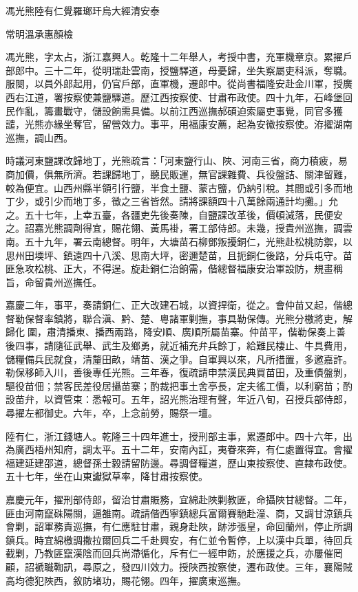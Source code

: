 
\begin{pinyinscope}
馮光熊陸有仁覺羅瑯玕烏大經清安泰

常明溫承惠顏檢

馮光熊，字太占，浙江嘉興人。乾隆十二年舉人，考授中書，充軍機章京。累擢戶部郎中。三十二年，從明瑞赴雲南，授鹽驛道，母憂歸，坐失察屬吏科派，奪職。服闋，以員外郎起用，仍官戶部，直軍機，遷郎中。從尚書福隆安赴金川軍，授廣西右江道，署按察使兼鹽驛道。歷江西按察使、甘肅布政使。四十九年，石峰堡回民作亂，籌畫戰守，儲設餉需具備。以前江西巡撫郝碩迫索屬吏事覺，同官多獲譴，光熊亦緣坐奪官，留營效力。事平，用福康安薦，起為安徽按察使。洊擢湖南巡撫，調山西。

時議河東鹽課改歸地丁，光熊疏言：「河東鹽行山、陜、河南三省，商力積疲，易商加價，俱無所濟。若課歸地丁，聽民販運，無官課雜費、兵役盤詰、關津留難，較為便宜。山西州縣半領引行鹽，半食土鹽、蒙古鹽，仍納引稅。其間或引多而地丁少，或引少而地丁多，徵之三省皆然。請將課額四十八萬餘兩通計均攤。」允之。五十七年，上幸五臺，各疆吏先後奏陳，自鹽課改革後，價頓減落，民便安之。詔嘉光熊調劑得宜，賜花翎、黃馬褂，署工部侍郎。未幾，授貴州巡撫，調雲南。五十九年，署云南總督。明年，大塘苗石柳鄧叛擾銅仁，光熊赴松桃防禦，以思州田堧坪、鎮遠四十八溪、思南大坪，密邇楚苗，且扼銅仁後路，分兵屯守。苗匪急攻松桃、正大，不得逞。旋赴銅仁治餉需，偕總督福康安治軍設防，規畫稱旨，命留貴州巡撫任。

嘉慶二年，事平，奏請銅仁、正大改建石城，以資捍衛，從之。會仲苗又起，偕總督勒保督率鎮將，聯合滇、黔、楚、粵諸軍剿撫，事具勒保傳。光熊分檄將吏，解歸化圍，肅清播東、播西兩路，降安順、廣順所屬苗寨。仲苗平，偕勒保奏上善後四事，請隨征武舉、武生及鄉勇，就近補充弁兵餘丁，給難民棲止、牛具費用，儲糧備兵民就食，清釐田畝，靖苗、漢之爭。自軍興以來，凡所措置，多邀嘉許。勒保移師入川，善後專任光熊。三年春，復疏請申禁漢民典買苗田，及重債盤剝，驅役苗佃；禁客民差役居攝苗寨；酌裁把事土舍亭長，定夫徭工價，以利窮苗；酌設苗弁，以資管束：悉報可。五年，詔光熊治理有聲，年近八旬，召授兵部侍郎，尋擢左都御史。六年，卒，上念前勞，賜祭一壇。

陸有仁，浙江錢塘人。乾隆三十四年進士，授刑部主事，累遷郎中。四十六年，出為廣西梧州知府，調太平。五十二年，安南內訌，夷眷來奔，有仁處置得宜。會擢福建延建邵道，總督孫士毅請留防邊。尋調督糧道，歷山東按察使、直隸布政使。五十七年，坐在山東讞獄草率，降甘肅按察使。

嘉慶元年，擢刑部侍郎，留治甘肅賑務，宜綿赴陜剿教匪，命攝陜甘總督。二年，匪由河南竄硃陽關，逼雒南。疏請偕西寧鎮總兵富爾賽馳赴潼、商，又調甘涼鎮兵會剿，詔軍務責巡撫，有仁應駐甘肅，親身赴陜，跡涉張皇，命回蘭州，停止所調鎮兵。時宜綿檄調撒拉爾回兵二千赴興安，有仁並令暫停，上以漢中兵單，待回兵截剿，乃教匪竄漢陰而回兵尚滯循化，斥有仁一經申飭，於應援之兵，亦屢催罔顧，詔褫職鞫訊，尋原之，發四川效力。授陜西按察使，遷布政使。三年，襄陽賊高均德犯陜西，敘防堵功，賜花翎。四年，擢廣東巡撫。


\end{pinyinscope}
